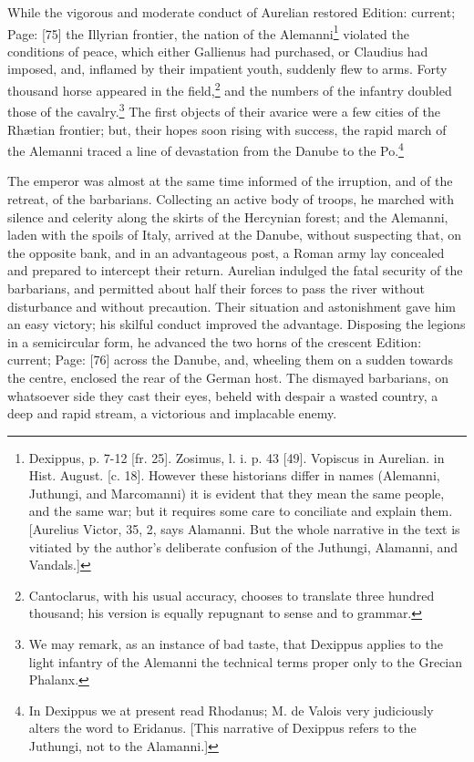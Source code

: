 While the vigorous and moderate conduct of Aurelian restored Edition: current; Page: [75] the Illyrian frontier, the nation of the Alemanni\footnote{Dexippus, p. 7-12 [fr. 25]. Zosimus, l. i. p. 43 [49]. Vopiscus in Aurelian. in Hist. August. [c. 18]. However these historians differ in names (Alemanni, Juthungi, and Marcomanni) it is evident that they mean the same people, and the same war; but it requires some care to conciliate and explain them. [Aurelius Victor, 35, 2, says Alamanni. But the whole narrative in the text is vitiated by the author\texthebrew{}’s deliberate confusion of the Juthungi, Alamanni, and Vandals.]} violated the conditions of peace, which either Gallienus had purchased, or Claudius had imposed, and, inflamed by their impatient youth, suddenly flew to arms. Forty thousand horse appeared in the field,\footnote{Cantoclarus, with his usual accuracy, chooses to translate three hundred thousand; his version is equally repugnant to sense and to grammar.} and the numbers of the infantry doubled those of the cavalry.\footnote{We may remark, as an instance of bad taste, that Dexippus applies to the light infantry of the Alemanni the technical terms proper only to the Grecian Phalanx.} The first objects of their avarice were a few cities of the Rhætian frontier; but, their hopes soon rising with success, the rapid march of the Alemanni traced a line of devastation from the Danube to the Po.\footnote{In Dexippus we at present read Rhodanus; M. de Valois very judiciously alters the word to Eridanus. [This narrative of Dexippus refers to the Juthungi, not to the Alamanni.]}

The emperor was almost at the same time informed of the irruption, and of the retreat, of the barbarians. Collecting an active body of troops, he marched with silence and celerity along the skirts of the Hercynian forest; and the Alemanni, laden with the spoils of Italy, arrived at the Danube, without suspecting that, on the opposite bank, and in an advantageous post, a Roman army lay concealed and prepared to intercept their return. Aurelian indulged the fatal security of the barbarians, and permitted about half their forces to pass the river without disturbance and without precaution. Their situation and astonishment gave him an easy victory; his skilful conduct improved the advantage. Disposing the legions in a semicircular form, he advanced the two horns of the crescent Edition: current; Page: [76] across the Danube, and, wheeling them on a sudden towards the centre, enclosed the rear of the German host. The dismayed barbarians, on whatsoever side they cast their eyes, beheld with despair a wasted country, a deep and rapid stream, a victorious and implacable enemy.

